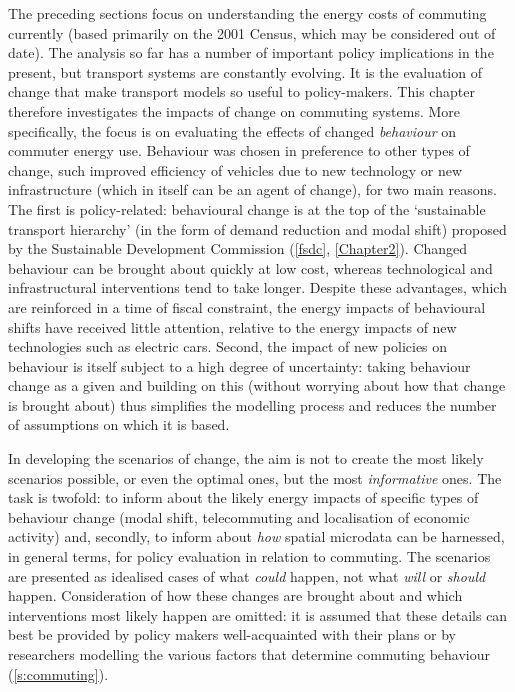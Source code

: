 The preceding sections focus on
understanding the energy costs of commuting currently (based primarily on the
2001 Census, which may be considered out of date). The analysis so far has a
number of important policy implications in the present, %
but transport systems are constantly evolving. It is the evaluation of
change
that make transport models so useful to policy-makers. This chapter
therefore 
investigates the impacts of change on commuting systems.
More specifically, the focus is on evaluating the effects of changed
\emph{behaviour} on commuter energy use.
Behaviour was chosen in preference to other types of change,
such improved efficiency of vehicles due to new technology or new
infrastructure (which in itself can be an agent of change), for two main
reasons. The first is policy-related:
behavioural change is at the top of the `sustainable transport
hierarchy' (in the form of demand reduction and modal shift) proposed by
the Sustainable Development Commission (\cref{fsdc}, \cref{Chapter2}).
Changed behaviour can be brought about quickly at low cost, whereas
technological and infrastructural interventions tend to take longer.
Despite these advantages, which are reinforced in a time of fiscal constraint,
the energy impacts of behavioural shifts have received little attention,
relative to the energy impacts of new technologies such as electric cars.
Second, the impact of new policies on behaviour is itself subject to a high
degree of uncertainty: taking behaviour change as a given and building
on this (without worrying about how that change is brought about)
thus simplifies the modelling process and reduces the number of assumptions
on which it is based. 

In developing the scenarios of change, the
aim is not to create the most likely scenarios possible, or even the
optimal ones, but the most \emph{informative} ones. The task is twofold:
to inform about the likely energy impacts of specific types of behaviour change
(modal shift, telecommuting and localisation of economic activity) and,
secondly, to inform about \emph{how} spatial microdata can be harnessed,
in general terms, for policy evaluation in relation to commuting. The scenarios
are presented as idealised cases of what \emph{could} happen, not what
\emph{will} or \emph{should} happen. Consideration of how these changes are
brought about and which interventions most likely happen are omitted: it is
assumed that these details can best be provided by policy makers well-acquainted
with their plans or by researchers modelling the various factors that determine
commuting behaviour (\cref{s:commuting}). %

